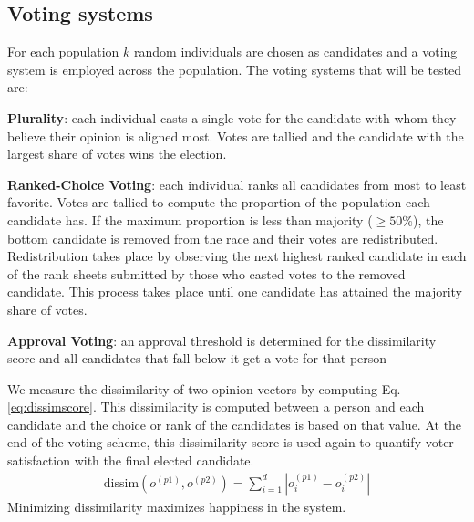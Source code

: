 \subsection{Voting systems}
For each population $k$ random individuals are chosen as candidates and a voting system is employed across the population.
The voting systems that will be tested are:
\begin{enum_tight}
\item {\bf Plurality}: each individual casts a single vote for the candidate with whom they believe their opinion is aligned most. 
    Votes are tallied and the candidate with the largest share of votes wins the election.
\item {\bf Ranked-Choice Voting}: each individual ranks all candidates from most to least favorite. 
    Votes are tallied to compute the proportion of the population each candidate has. 
    If the maximum proportion is less than majority ($\geq 50\%$), the bottom candidate is removed from the race and their votes are redistributed.
    Redistribution takes place by observing the next highest ranked candidate in each of the rank sheets submitted by those who casted votes
    to the removed candidate. This process takes place until one candidate has attained the majority share of votes.
\item {\bf Approval Voting}: an approval threshold is determined for the dissimilarity score and all candidates that fall below it get a vote for that person
\end{enum_tight}
We measure the dissimilarity of two opinion vectors by computing Eq. \ref{eq:dissimscore}.
This dissimilarity is computed between a person and each candidate and the choice or rank of the candidates is based on that value.
At the end of the voting scheme, this dissimilarity score is used again to quantify voter satisfaction with the final elected candidate.
\begin{align}
    \text{dissim}(o^{(p1)},o^{(p2)}) = \sum_{i=1}^{d}|o^{(p1)}_i - o^{(p2)}_i|
    \label{eq:dissimscore}
\end{align}
Minimizing dissimilarity maximizes happiness in the system.

